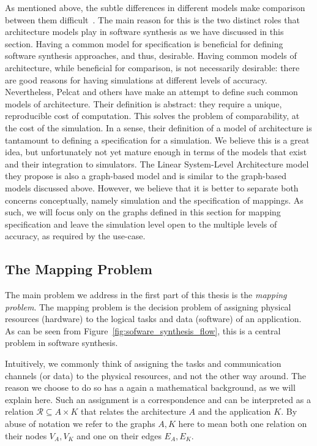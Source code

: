 As mentioned above, the subtle differences in different models make comparison between them difficult~\cite{goens_mcsoc16}.
The main reason for this is the two distinct roles that architecture models play in software synthesis as we have discussed in this section.
Having a common model for specification is beneficial for defining software synthesis approaches, and thus, desirable.
Having common models of architecture, while beneficial for comparison, is not necessarily desirable: there are good reasons for having simulations at different levels of accuracy.
Nevertheless, Pelcat and others have \cite{pelcat2015models} make an attempt to define such common models of architecture.
Their definition is abstract: they require a unique, reproducible cost of computation.
This solves the problem of comparability, at the cost of the simulation.
In a sense, their definition of a model of architecture is tantamount to defining a specification for a simulation.
We believe this is a great idea, but unfortunately not yet mature enough in terms of the models that exist and their integration to simulators.
The Linear System-Level Architecture model they propose is also a graph-based model and is similar to the graph-based models discussed above.
However, we believe that it is better to separate both concerns conceptually, namely simulation and the specification of mappings.
As such, we will focus only on the graphs defined in this section for mapping specification and leave the simulation level open to the multiple levels of accuracy, as required by the use-case.

\subsection{The Mapping Problem}

The main problem we address in the first part of this thesis is the \emph{mapping problem}.
The mapping problem is the decision problem of assigning physical resources (hardware) to the logical tasks and data (software) of an application.
As can be seen from Figure~\ref{fig:sofware_synthesis_flow}, this is a central problem in software synthesis.

Intuitively, we commonly think of assigning the tasks and communication channels (or data) to the physical resources, and not the other way around. 
The reason we choose to do so has a again a mathematical background, as we will explain here.
Such an assignment is a correspondence and can be interpreted as a relation $\mathcal{R} \subseteq A \times K$ that relates the architecture $A$ and the application $K$.
By abuse of notation we refer to the graphs $A,K$ here to mean both one relation on their nodes $V_A,V_K$ and one on their edges $E_A,E_K$.

